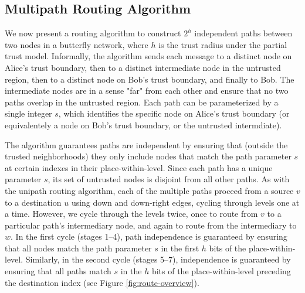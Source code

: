 \documentclass{sig-alternate-05-2015}
\begin{document}
\subsection{Multipath Routing Algorithm}

We now present a routing algorithm to construct $2^h$ independent paths
between two nodes in a butterfly network,
where $h$ is the trust radius under the partial trust model.
Informally, the algorithm sends each message to a distinct node on Alice's
trust boundary, then to a distinct intermediate node in the untrusted region,
then to a distinct node on Bob's trust boundary, and finally to Bob.
The intermediate nodes are in a sense "far" from each other and ensure that
no two paths overlap in the untrusted region.
Each path can be parameterized by a single integer $s$, which identifies
the specific node on Alice's trust boundary
(or equivalentely a node on Bob's trust boundary, or the untrusted intermdiate).

The algorithm guarantees paths are independent by ensuring that
(outside the trusted neighborhoods)
they only include
nodes that match the path parameter $s$ at certain indexes in their
place-within-level.
Since each path has a unique parameter $s$,
its set of untrusted nodes is disjoint from all other paths.
As with the unipath routing algorithm,
each of the multiple paths proceed from a source $v$ to a destination $u$
using down and down-right edges,
cycling through levels one at a time.
However, we cycle through the levels twice, once to route from $v$ to a
particular path's intermediary node,
and again to route from the intermediary to $w$.
In the first cycle (stages 1--4), path independence is guaranteed by ensuring that
all nodes match the path parameter $s$ in the first $h$ bits of the place-within-level.
Similarly, in the second cycle (stages 5--7),
independence is guaranteed by ensuring that all paths match $s$ in the
$h$ bits of the place-within-level preceding the destination index
(see Figure \ref{fig:route-overview}).
\end{document}
